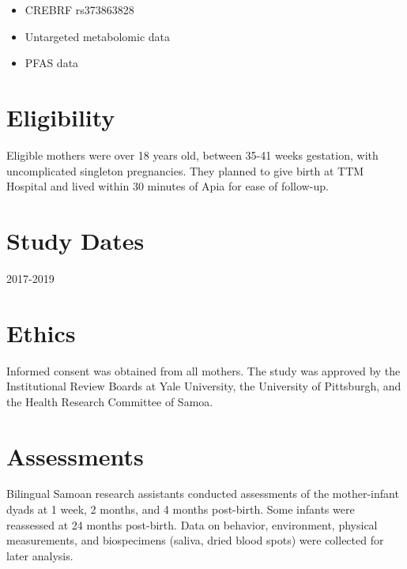 \documentclass[
  letterpaper,
  DIV=11,
  numbers=noendperiod]{scrreprt}
\providecommand{\tightlist}{%
  \setlength{\itemsep}{0pt}\setlength{\parskip}{0pt}}\usepackage{longtable,booktabs,array}
\begin{document}

\begin{itemize}
\tightlist
\item
  CREBRF rs373863828
\item
  Untargeted metabolomic data
\item
  PFAS data
\end{itemize}

\section*{Eligibility}\label{eligibility}


Eligible mothers were over 18 years old, between 35-41 weeks gestation,
with uncomplicated singleton pregnancies. They planned to give birth at
TTM Hospital and lived within 30 minutes of Apia for ease of follow-up.

\section*{Study Dates}\label{study-dates}


2017-2019

\section*{Ethics}\label{ethics}


Informed consent was obtained from all mothers. The study was approved
by the Institutional Review Boards at Yale University, the University of
Pittsburgh, and the Health Research Committee of Samoa.

\section*{Assessments}\label{assessments}


Bilingual Samoan research assistants conducted assessments of the
mother-infant dyads at 1 week, 2 months, and 4 months post-birth. Some
infants were reassessed at 24 months post-birth. Data on behavior,
environment, physical measurements, and biospecimens (saliva, dried
blood spots) were collected for later analysis.
\end{document}
